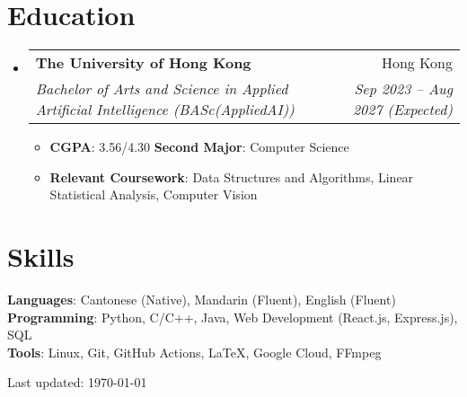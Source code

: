 \documentclass[a4paper,10pt]{article}
\makeatletter
\newcommand{\resumeItem}[1]{
  \item\small{#1}
}
\newcommand{\resumeSubheading}[4]{
  \vspace{-2pt}\item
    \begin{tabular*}{0.97\textwidth}[t]{@{}l@{\extracolsep{\fill}}r@{}}
      \textbf{#1} & \small#2 \\
      \textit{\small#3} & \textit{\small#4} \\
    \end{tabular*}\vspace{-7pt}
}
\newcommand{\resumeSubHeadingListStart}{\begin{itemize}[leftmargin=0.15in, label={}, itemsep=1pt]}
\newcommand{\resumeSubHeadingListEnd}{\end{itemize}}
\newcommand{\resumeItemListStart}{
  \begin{itemize}[
    leftmargin=0.2in,
    rightmargin=0.2in,
    itemindent=0pt,
    labelsep=0.1in,
    itemsep=1pt,
    parsep=0pt,
    topsep=3pt,
    label={\raisebox{2pt}{\tiny$\bullet$}}
  ]
}
\newcommand{\resumeItemListEnd}{\end{itemize}}
\makeatother
\begin{document}
\section{Education}
  \resumeSubHeadingListStart
    \resumeSubheading
      {The University of Hong Kong}{Hong Kong}
      {Bachelor of Arts and Science in Applied Artificial Intelligence (BASc(AppliedAI))}{Sep 2023 -- Aug 2027 (Expected)}
      \resumeItemListStart
        \resumeItem{\textbf{CGPA}: 3.56/4.30 \quad \textbf{Second Major}: Computer Science}
        \resumeItem{\textbf{Relevant Coursework}: Data Structures and Algorithms, Linear Statistical Analysis, Computer Vision}
      \resumeItemListEnd
  \resumeSubHeadingListEnd

\section{Skills}
  \begin{itemize}[leftmargin=0.15in, label={}]
    \small{\item{
      \textbf{Languages}{: Cantonese (Native), Mandarin (Fluent), English (Fluent)} \\[2pt]
      \textbf{Programming}{: Python, C/C++, Java, Web Development (React.js, Express.js), SQL} \\[2pt]
      \textbf{Tools}{: Linux, Git, GitHub Actions, LaTeX, Google Cloud, FFmpeg}
    }}
  \end{itemize}

\vfill
\begin{center}
\footnotesize
Last updated: \today
\end{center}
\end{document}
